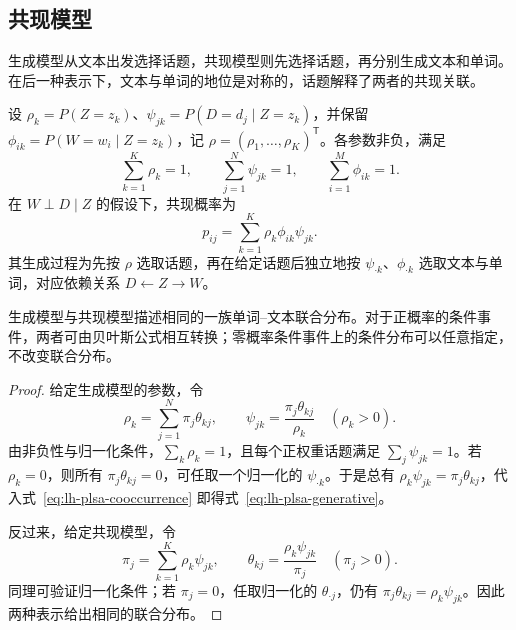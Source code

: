 \subsection{共现模型}
\label{subsec:lh-plsa-cooccurrence}

生成模型从文本出发选择话题，共现模型则先选择话题，再分别生成文本和单词。在后一种表示下，文本与单词的地位是对称的，话题解释了两者的共现关联。

\begin{definition}[概率潜在语义分析的共现模型]
\label{def:lh-plsa-cooccurrence}
设 $\rho_k=P(Z=z_k)$、$\psi_{jk}=P(D=d_j\mid Z=z_k)$，并保留 $\phi_{ik}=P(W=w_i\mid Z=z_k)$，记 $\rho=(\rho_1,\ldots,\rho_K)^{\mathsf T}$。各参数非负，满足
\[
\sum_{k=1}^K\rho_k=1,\qquad
\sum_{j=1}^N\psi_{jk}=1,\qquad
\sum_{i=1}^M\phi_{ik}=1.
\]
在 $W\perp D\mid Z$ 的假设下，共现概率为
\begin{equation}
p_{ij}=\sum_{k=1}^K\rho_k\phi_{ik}\psi_{jk}.
\label{eq:lh-plsa-cooccurrence}
\end{equation}
其生成过程为先按 $\rho$ 选取话题，再在给定话题后独立地按 $\psi_{\cdot k}$、$\phi_{\cdot k}$ 选取文本与单词，对应依赖关系 $D\leftarrow Z\to W$。
\end{definition}

\begin{proposition}[两种模型的等价性]
\label{prop:lh-plsa-equivalence}
生成模型与共现模型描述相同的一族单词--文本联合分布。对于正概率的条件事件，两者可由贝叶斯公式相互转换；零概率条件事件上的条件分布可以任意指定，不改变联合分布。
\end{proposition}
\begin{proof}
给定生成模型的参数，令
\begin{equation}
\rho_k=\sum_{j=1}^N\pi_j\theta_{kj},\qquad
\psi_{jk}=\frac{\pi_j\theta_{kj}}{\rho_k}\quad(\rho_k>0).
\label{eq:lh-plsa-generative-to-cooccurrence}
\end{equation}
由非负性与归一化条件，$\sum_k\rho_k=1$，且每个正权重话题满足 $\sum_j\psi_{jk}=1$。若 $\rho_k=0$，则所有 $\pi_j\theta_{kj}=0$，可任取一个归一化的 $\psi_{\cdot k}$。于是总有 $\rho_k\psi_{jk}=\pi_j\theta_{kj}$，代入式~\eqref{eq:lh-plsa-cooccurrence} 即得式~\eqref{eq:lh-plsa-generative}。

反过来，给定共现模型，令
\begin{equation}
\pi_j=\sum_{k=1}^K\rho_k\psi_{jk},\qquad
\theta_{kj}=\frac{\rho_k\psi_{jk}}{\pi_j}\quad(\pi_j>0).
\label{eq:lh-plsa-cooccurrence-to-generative}
\end{equation}
同理可验证归一化条件；若 $\pi_j=0$，任取归一化的 $\theta_{\cdot j}$，仍有 $\pi_j\theta_{kj}=\rho_k\psi_{jk}$。因此两种表示给出相同的联合分布。\qedhere
\end{proof}

